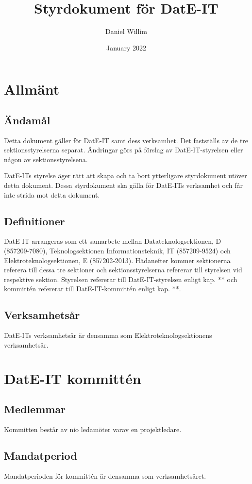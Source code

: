 \documentclass{article}
\title{Styrdokument för DatE-IT}
\author{Daniel Willim}
\date{January 2022}
\begin{document}
\maketitle

\section{Allmänt}
\subsection{Ändamål}
Detta dokument gäller för DatE-IT samt dess verksamhet. Det fastställs av de tre sektionsstyrelserna separat. Ändringar görs på förslag av DatE-IT-styrelsen eller någon av sektionsstyrelsena.

DatE-ITs styrelse äger rätt att skapa och ta bort ytterligare styrdokument utöver detta dokument. Dessa styrdokument ska gälla för DatE-ITs verksamhet och får inte strida mot detta dokument.

\subsection{Definitioner}
DatE-IT arrangeras som ett samarbete mellan Datateknologsektionen, D (857209-7080), Teknologsektionen Informationsteknik, IT (857209-9524) och Elektroteknologsektionen, E (857202-2013). Hädanefter kommer sektionerna referera till dessa tre sektioner och sektionsstyrelserna refererar till styrelsen vid respektive sektion.
Styrelsen refererar till DatE-IT-styrelsen enligt kap. ** och kommittén refererar till DatE-IT-kommittén enligt kap. **.

\subsection{Verksamhetsår}
DatE-ITs verksamhetsår är densamma som Elektroteknologsektionens verksamhetsår.

\section{DatE-IT kommittén}
\subsection{Medlemmar}
Kommitten består av nio ledamöter varav en projektledare.

\subsection{Mandatperiod}
Mandatperioden för kommittén är densamma som verksamhetsåret.
\end{document}
